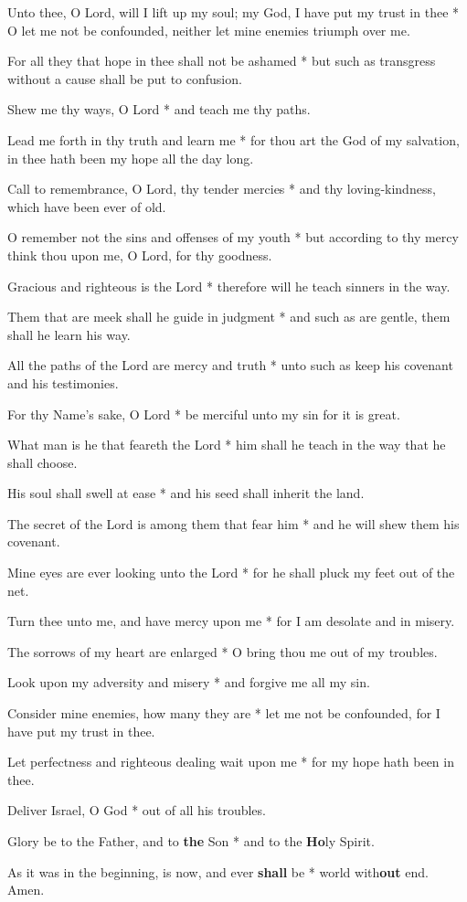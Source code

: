 \begin{multicols}{2}
	Unto thee, O Lord, will I lift up my soul; my God, I have put my trust in thee * O let me not be confounded, neither let mine enemies triumph over me.
	
	For all they that hope in thee shall not be ashamed * but such as transgress without a cause shall be put to confusion.
	
	Shew me thy ways, O Lord * and teach me thy paths.
	
	Lead me forth in thy truth and learn me * for thou art the God of my salvation, in thee hath been my hope all the day long.
	
	Call to remembrance, O Lord, thy tender mercies * and thy loving-kindness, which have been ever of old.
	
	O remember not the sins and offenses of my youth * but according to thy mercy think thou upon me, O Lord, for thy goodness.
	
	Gracious and righteous is the Lord * therefore will he teach sinners in the way.
	
	Them that are meek shall he guide in judgment * and such as are gentle, them shall he learn his way.
	
	All the paths of the Lord are mercy and truth * unto such as keep his covenant and his testimonies.
	
	For thy Name's sake, O Lord * be merciful unto my sin for it is great.
	
	What man is he that feareth the Lord * him shall he teach in the way that he shall choose.
	
	His soul shall swell at ease * and his seed shall inherit the land.
	
	The secret of the Lord is among them that fear him * and he will shew them his covenant.
	
	Mine eyes are ever looking unto the Lord * for he shall pluck my feet out of the net.
	
	Turn thee unto me, and have mercy upon me * for I am desolate and in misery.
	
	The sorrows of my heart are enlarged * O bring thou me out of my troubles.
	
	Look upon my adversity and misery * and forgive me all my sin.
	
	Consider mine enemies, how many they are * let me not be confounded, for I have put my trust in thee.
	
	Let perfectness and righteous dealing wait upon me * for my hope hath been in thee.
	
	Deliver Israel, O God * out of all his troubles.
	
	Glory be to the Father, and to \textbf{the} Son * and to the \textbf{Ho}ly Spirit.
	
	As it was in the beginning, is now, and ever \textbf{shall} be * world with\textbf{out} end. Amen.
\end{multicols}